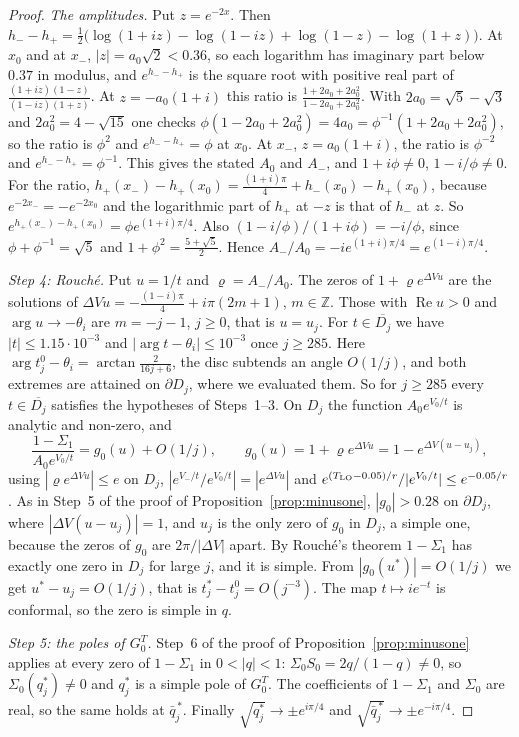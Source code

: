 \documentclass[11pt]{article}
\theoremstyle{plain}
\theoremstyle{definition}
\theoremstyle{remark}
\newcommand{\Z}{\mathbb{Z}}
\theoremstyle{plain}\newtheorem*{maintheorem}{Main Theorem}
\begin{document}
\begin{proof}
\emph{The amplitudes.} Put $z=e^{-2x}$. Then
$h_--h_+=\frac12\bigl(\log(1+iz)-\log(1-iz)+\log(1-z)-\log(1+z)\bigr)$. At $x_0$ and at $x_-$,
$|z|=a_0\sqrt2<0.36$, so each logarithm has imaginary part below $0.37$ in modulus, and $e^{h_--h_+}$ is the
square root with positive real part of $\frac{(1+iz)(1-z)}{(1-iz)(1+z)}$. At $z=-a_0(1+i)$ this ratio is
$\frac{1+2a_0+2a_0^2}{1-2a_0+2a_0^2}$. With $2a_0=\sqrt5-\sqrt3$ and $2a_0^2=4-\sqrt{15}$ one checks
$\phi(1-2a_0+2a_0^2)=4a_0=\phi^{-1}(1+2a_0+2a_0^2)$, so the ratio is $\phi^2$ and $e^{h_--h_+}=\phi$ at $x_0$.
At $x_-$, $z=a_0(1+i)$, the ratio is $\phi^{-2}$ and $e^{h_--h_+}=\phi^{-1}$. This gives the stated $A_0$ and
$A_-$, and $1+i\phi\ne0$, $1-i/\phi\ne0$. For the ratio, $h_+(x_-)-h_+(x_0)=\frac{(1+i)\pi}4+h_-(x_0)-h_+(x_0)$, because
$e^{-2x_-}=-e^{-2x_0}$ and the logarithmic part of $h_+$ at $-z$ is that of $h_-$ at $z$. So
$e^{h_+(x_-)-h_+(x_0)}=\phi e^{(1+i)\pi/4}$. Also $(1-i/\phi)/(1+i\phi)=-i/\phi$, since
$\phi+\phi^{-1}=\sqrt5$ and $1+\phi^2=\frac{5+\sqrt5}2$. Hence $A_-/A_0=-ie^{(1+i)\pi/4}=e^{(1-i)\pi/4}$.

\emph{Step 4: Rouch\'e.} Put $u=1/t$ and $\varrho=A_-/A_0$. The zeros of $1+\varrho e^{\Delta Vu}$ are the
solutions of $\Delta Vu=-\frac{(1-i)\pi}4+i\pi(2m+1)$, $m\in\Z$. Those with $\operatorname{Re}u>0$ and
$\arg u\to-\theta_i$ are $m=-j-1$, $j\ge0$, that is $u=u_j$. For $t\in\overline{D_j}$ we have
$|t|\le1.15\cdot10^{-3}$ and $|\arg t-\theta_i|\le10^{-3}$ once $j\ge285$. Here
$\arg t^0_j-\theta_i=\arctan\frac2{16j+6}$, the disc subtends an angle $O(1/j)$, and both extremes are
attained on $\partial D_j$, where we evaluated them. So for $j\ge285$ every $t\in\overline{D_j}$ satisfies the hypotheses of Steps~1--3. On $D_j$ the
function $A_0e^{V_0/t}$ is analytic and non-zero, and
\[
   \frac{1-\Sigma_1}{A_0e^{V_0/t}}=g_0(u)+O(1/j),\qquad g_0(u)=1+\varrho e^{\Delta Vu}=1-e^{\Delta V(u-u_j)} ,
\]
using $|\varrho e^{\Delta Vu}|\le e$ on $D_j$, $|e^{V_-/t}/e^{V_0/t}|=|e^{\Delta Vu}|$ and
$e^{(T_{\rm LO}-0.05)/r}/|e^{V_0/t}|\le e^{-0.05/r}$. As in Step~5 of the proof of
Proposition~\ref{prop:minusone}, $|g_0|>0.28$ on $\partial D_j$, where $|\Delta V(u-u_j)|=1$, and $u_j$ is
the only zero of $g_0$ in $D_j$, a simple one, because the zeros of $g_0$ are $2\pi/|\Delta V|$ apart. By
Rouch\'e's theorem $1-\Sigma_1$ has exactly one zero in $D_j$ for large $j$, and it is simple. From
$|g_0(u^\ast)|=O(1/j)$ we get $u^\ast-u_j=O(1/j)$, that is $t^\ast_j-t^0_j=O(j^{-3})$. The map
$t\mapsto ie^{-t}$ is conformal, so the zero is simple in $q$.

\emph{Step 5: the poles of $G^T_0$.} Step~6 of the proof of Proposition~\ref{prop:minusone} applies at
every zero of $1-\Sigma_1$ in $0<|q|<1$: $\Sigma_0S_0=2q/(1-q)\ne0$, so $\Sigma_0(q^\ast_j)\ne0$ and
$q^\ast_j$ is a simple pole of $G^T_0$. The coefficients of $1-\Sigma_1$ and $\Sigma_0$ are real, so the
same holds at $\bar q^{\,\ast}_j$. Finally $\sqrt{q^\ast_j}\to\pm e^{i\pi/4}$ and
$\sqrt{\bar q^{\,\ast}_j}\to\pm e^{-i\pi/4}$.
\end{proof}
\end{document}
